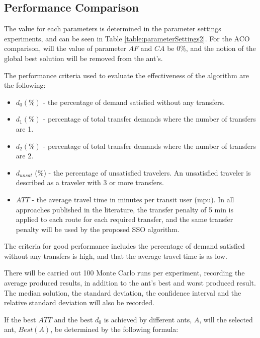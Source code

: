 \subsection{Performance Comparison}
\label{subsec:performanceComparison_setup}

The value for each parameters is determined in the parameter settings experiments, and can be seen in Table \vref{table:parameterSettings2}. For the ACO comparison, will the value of parameter $AF$ and $CA$ be 0\%, and the notion of the global best solution will be removed from the ant's. 

The performance criteria used to evaluate the effectiveness of the algorithm are the following:
\begin{itemize}
\item $d_0 (\%)$ - the percentage of demand satisfied without any transfers. 
\item $d_1 (\%)$ - percentage of total transfer demands where the number of transfers are 1. 
\item $d_2 (\%)$ - percentage of total transfer demands where the number of transfers are 2. 
\item $d_{unsat}$ (\%) - the percentage of unsatisfied travelers. An unsatisfied traveler is described as a traveler with 3 or more transfers. 
\item $ATT$  - the average travel time in minutes per transit user (mpu). In all approaches published in the literature, the transfer penalty of 5 min is applied to each route for each required transfer, and the same transfer penalty will be used by the proposed SSO algorithm.
\end{itemize}
The criteria for good performance includes the percentage of demand satisfied without any transfers is high, and that the average travel time is as low.

There will be carried out 100 Monte Carlo runs per experiment, recording the average produced results, in addition to the ant's best and worst produced result. The median solution, the standard deviation, the confidence interval and the relative standard deviation will also be recorded.

If the best $ATT$ and the best $d_0$ is achieved by different ants, $A$, will the selected ant, $Best(A)$, be determined by the following formula:

